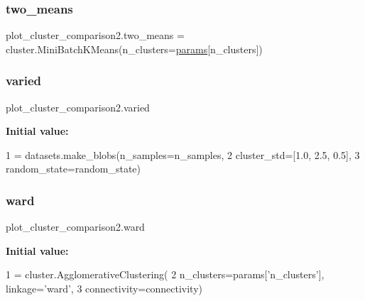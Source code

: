\subsubsection{\texorpdfstring{two\+\_\+means}{two\_means}}
{\footnotesize\ttfamily plot\+\_\+cluster\+\_\+comparison2.\+two\+\_\+means = cluster.\+Mini\+Batch\+K\+Means(n\+\_\+clusters=\hyperlink{namespaceplot__cluster__comparison2_a2c45c06ff9f589e117a4d45eca4dd71d}{params}\mbox{[}\textquotesingle{}n\+\_\+clusters\textquotesingle{}\mbox{]})}

\mbox{\label{namespaceplot__cluster__comparison2_a8b8763833c1544180f6ba2b8d9d869a8}} 
\subsubsection{\texorpdfstring{varied}{varied}}
{\footnotesize\ttfamily plot\+\_\+cluster\+\_\+comparison2.\+varied}

{\bfseries Initial value\+:}
\begin{DoxyCode}
1 =  datasets.make\_blobs(n\_samples=n\_samples,
2                              cluster\_std=[1.0, 2.5, 0.5],
3                              random\_state=random\_state)
\end{DoxyCode}
\mbox{\label{namespaceplot__cluster__comparison2_a1a405b7da768fe2a548809032a917e68}} 
\subsubsection{\texorpdfstring{ward}{ward}}
{\footnotesize\ttfamily plot\+\_\+cluster\+\_\+comparison2.\+ward}

{\bfseries Initial value\+:}
\begin{DoxyCode}
1 =  cluster.AgglomerativeClustering(
2         n\_clusters=params[\textcolor{stringliteral}{'n\_clusters'}], linkage=\textcolor{stringliteral}{'ward'},
3         connectivity=connectivity)
\end{DoxyCode}
\mbox{\label{namespaceplot__cluster__comparison2_abf9f9bec73943e1bc8342d3e8d251694}} 
